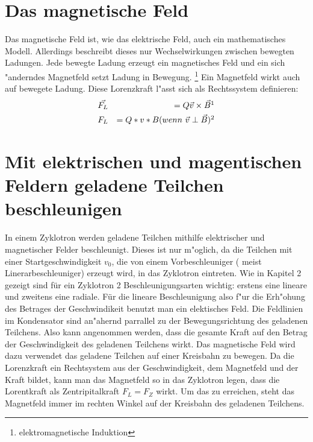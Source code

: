 \documentclass[14pt, a4paper]{report}
\begin{document}
\section{Das magnetische Feld}
Das magnetische Feld ist, wie das elektrische Feld, auch ein mathematisches Modell.
Allerdings beschreibt dieses nur Wechselwirkungen zwischen bewegten Ladungen. Jede
bewegte Ladung erzeugt ein magnetisches Feld und ein sich "anderndes Magnetfeld 
setzt Ladung in Bewegung. \footnote{elektromagnetische Induktion}
Ein Magnetfeld wirkt auch auf bewegete Ladung. Diese Lorenzkraft l"asst sich als
Rechtssystem definieren:
\begin{eqnarray} \label{E-Feld-Gleichungen}
 \vec{F_L} && = Q\vec{v} \times \vec{B} \footnotemark \\
 F_L && = Q * v * B (wenn ~ \vec{v} \perp \vec{B}) \footnotemark
\end{eqnarray}

 
\section{Mit elektrischen und magentischen Feldern geladene Teilchen beschleunigen}
In einem Zyklotron werden geladene Teilchen mithilfe elektrischer und magnetischer 
Felder beschleunigt. Dieses ist nur m"oglich, da die Teilchen mit einer
Startgeschwindigkeit $v_0$, die von einem Vorbeschleuniger ( meist 
Linerarbeschleuniger) erzeugt wird, in das Zyklotron eintreten. Wie in Kapitel 2 
gezeigt 
sind für ein Zyklotron 2 Beschleunigungsarten wichtig: erstens eine lineare und 
zweitens eine radiale. Für die lineare Beschleunigung also f"ur die Erh"ohung des 
Betrages der Geschwindikeit benutzt man ein elektisches Feld. Die Feldlinien im 
Kondensator sind an"ahernd parrallel zu der Bewegungsrichtung des geladenen Teilchens. 
Also kann angenommen werden, dass die gesamte Kraft auf den Betrag der Geschwindigkeit 
des geladenen Teilchens wirkt. Das magnetische Feld wird dazu verwendet das geladene
Teilchen auf einer Kreisbahn zu bewegen. Da die Lorenzkraft ein Rechtsystem aus der
Geschwindigkeit, dem Magnetfeld und der Kraft bildet, kann man das Magnetfeld so
in das Zyklotron legen, dass die Lorentkraft als Zentripitalkraft $F_L = F_Z$ wirkt.
Um das zu erreichen, steht das Magnetfeld immer im rechten Winkel auf der Kreisbahn
des geladenen Teilchens.
\end{document}
